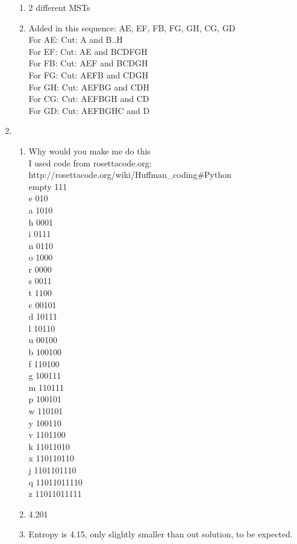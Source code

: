 \documentclass[11pt]{article}
\begin{document}
\begin{enumerate}
\begin{enumerate}
\item 2 different MSTs
\item Added in this sequence: AE, EF, FB, FG, GH, CG, GD\\
For AE: Cut: A and B..H\\
For EF: Cut: AE and BCDFGH\\
For FB: Cut: AEF and BCDGH\\
For FG: Cut: AEFB and CDGH\\
For GH: Cut: AEFBG and CDH\\
For CG: Cut: AEFBGH and CD\\
For GD: Cut: AEFBGHC and D\\
\end{enumerate}
\newpage
\item
\begin{enumerate}
\item Why would you make me do this\\
I used code from rosettacode.org: http://rosettacode.org/wiki/Huffman\_coding\#Python\\
empty	111\\
e	010\\
a	1010\\
h	0001\\
i	0111\\
n	0110\\
o	1000\\
r	0000\\
s	0011\\
t	1100\\
c	00101\\
d	10111\\
l	10110\\
u	00100\\
b	100100\\
f	110100\\
g	100111\\
m	110111\\
p	100101\\
w	110101\\
y	100110\\
v	1101100\\
k	11011010\\
x	110110110\\
j	1101101110\\
q	11011011110\\
z	11011011111
\item 4.201
\item Entropy is 4.15, only slightly smaller than out solution, to be expected.

\end{enumerate}
\end{enumerate}
\end{document}
